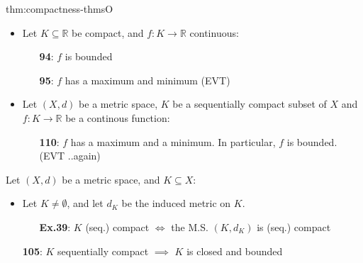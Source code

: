 \documentclass[landscape, 8pt]{extarticle}
\begin{document}
\begin{multicols}{3}
\begin{thm}{thm:compactness-thms}{O}
\begin{itemize}[leftmargin=1.5em]
    
    \end{itemize}

    \vspace{-8pt}
    \vspace{-7pt}
    \begin{itemize}[leftmargin=1.5em]
        \item Let $K \subseteq \mathbb{R}$ be compact, and $f : K \to \mathbb{R}$ continuous:
            \vspace{-5pt}
            \begin{itemize}
                \item[\textbf{94}:] $f$ is bounded
                \item[\textbf{95}:] $f$ has a maximum and minimum (EVT)
            \end{itemize}
        \vspace{-5pt}
        \item Let $(X, d)$ be a metric space, $K$ be a sequentially compact subset of $X$ and $f : K \to \mathbb{R}$ be a continous function:
            \vspace{-5pt}
            \begin{itemize}
                \item[\textbf{110}:] $f$ has a maximum and a minimum. In particular, $f$ is bounded. (EVT ..again)
            \end{itemize} 
    \end{itemize}

    \vspace{-5pt}
    \vspace{-3pt}

    Let $(X, d)$ be a metric space, and $K \subseteq X$:
    \vspace{-5pt}
    \begin{itemize}[leftmargin=1.5em]
        \item Let $K\ne\emptyset$, and let $d_{K}$ be the induced metric on $K$.
            \vspace{-3pt}
            \begin{itemize}
                \item[\textbf{Ex.39}:] $K$ (seq.) compact $\iff$ the M.S. $(K, d_{K})$ is (seq.) compact
            \end{itemize}
            
            \vspace{-2pt}
        \item[\textbf{105}:] $K$ sequentially compact $\implies$ $K$ is closed and bounded


\end{itemize}
\end{thm}
\end{multicols}
\end{document}
